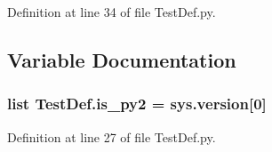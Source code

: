 Definition at line 34 of file Test\-Def.\-py.



\subsection{Variable Documentation}
\hypertarget{namespace_test_def_a4e87724b7a6a117c2cca22c557936868}{
\subsubsection[{is\-\_\-py2}]{\setlength{\rightskip}{0pt plus 5cm}list Test\-Def.\-is\-\_\-py2 = sys.\-version\mbox{[}0\mbox{]}}}\label{namespace_test_def_a4e87724b7a6a117c2cca22c557936868}


Definition at line 27 of file Test\-Def.\-py.


